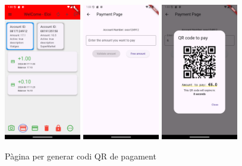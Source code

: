 \documentclass[a4paper,12pt,twoside]{ThesisStyle}
\begin{document}
\begin{figure}[h]
    \centering
    \includegraphics[width=0.3\textwidth]{imatges/mainPage2.png}
    \includegraphics[width=0.3\textwidth]{imatges/paymentPage.png}
    \includegraphics[width=0.3\textwidth]{imatges/paymentPageWithValue.png}
    \caption{ Pàgina per generar codi QR de pagament}
    \label{fig: Pàgina per generar codi QR de pagament}
\end{figure}
\end{document}
